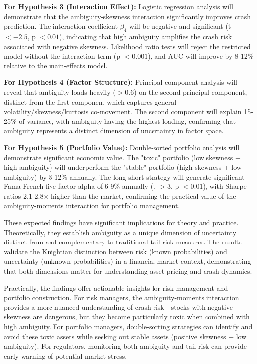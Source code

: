 \documentclass[preprint,12pt,authoryear]{elsarticle}
\begin{document}
\textbf{For Hypothesis 3 (Interaction Effect):} Logistic regression analysis will demonstrate that the ambiguity-skewness interaction significantly improves crash prediction. The interaction coefficient $\beta_4$ will be negative and significant (t $< -2.5$, p $< 0.01$), indicating that high ambiguity amplifies the crash risk associated with negative skewness. Likelihood ratio tests will reject the restricted model without the interaction term (p $< 0.001$), and AUC will improve by 8-12\% relative to the main-effects model.

\textbf{For Hypothesis 4 (Factor Structure):} Principal component analysis will reveal that ambiguity loads heavily ($>0.6$) on the second principal component, distinct from the first component which captures general volatility/skewness/kurtosis co-movement. The second component will explain 15-25\% of variance, with ambiguity having the highest loading, confirming that ambiguity represents a distinct dimension of uncertainty in factor space.

\textbf{For Hypothesis 5 (Portfolio Value):} Double-sorted portfolio analysis will demonstrate significant economic value. The "toxic" portfolio (low skewness + high ambiguity) will underperform the "stable" portfolio (high skewness + low ambiguity) by 8-12\% annually. The long-short strategy will generate significant Fama-French five-factor alpha of 6-9\% annually (t $> 3$, p $< 0.01$), with Sharpe ratios 2.1-2.8× higher than the market, confirming the practical value of the ambiguity-moments interaction for portfolio management.

These expected findings have significant implications for theory and practice. Theoretically, they establish ambiguity as a unique dimension of uncertainty distinct from and complementary to traditional tail risk measures. The results validate the Knightian distinction between risk (known probabilities) and uncertainty (unknown probabilities) in a financial market context, demonstrating that both dimensions matter for understanding asset pricing and crash dynamics.

Practically, the findings offer actionable insights for risk management and portfolio construction. For risk managers, the ambiguity-moments interaction provides a more nuanced understanding of crash risk—stocks with negative skewness are dangerous, but they become particularly toxic when combined with high ambiguity. For portfolio managers, double-sorting strategies can identify and avoid these toxic assets while seeking out stable assets (positive skewness + low ambiguity). For regulators, monitoring both ambiguity and tail risk can provide early warning of potential market stress.
\end{document}
